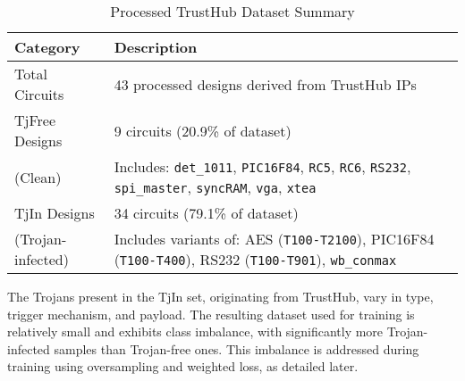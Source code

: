 \documentclass[sigplan,screen]{acmart}
\begin{document}
\begin{table}[htbp]
  \caption{Processed TrustHub Dataset Summary}
  \label{tab:dataset_summary}
  \begin{tabular}{lp{4.8cm}}
    \toprule
    \textbf{Category} & \textbf{Description} \\
    \midrule
    Total Circuits & 43 processed designs derived from TrustHub IPs \\
    \midrule
    TjFree Designs & 9 circuits (20.9\% of dataset)\\
    (Clean) & Includes: \texttt{det\_1011}, \texttt{PIC16F84}, \texttt{RC5}, \texttt{RC6}, \texttt{RS232}, \texttt{spi\_master}, \texttt{syncRAM}, \texttt{vga}, \texttt{xtea} \\
    \midrule
    TjIn Designs & 34 circuits (79.1\% of dataset)\\
    (Trojan-infected) & Includes variants of: AES (\texttt{T100-T2100}), PIC16F84 (\texttt{T100-T400}), RS232 (\texttt{T100-T901}), \texttt{wb\_conmax} \\
    \bottomrule
  \end{tabular}
  \vspace{-2mm}
\end{table}

The Trojans present in the TjIn set, originating from TrustHub, vary in type, trigger mechanism, and payload. The resulting dataset used for training is relatively small and exhibits class imbalance, with significantly more Trojan-infected samples than Trojan-free ones. This imbalance is addressed during training using oversampling and weighted loss, as detailed later. 


\end{document}
